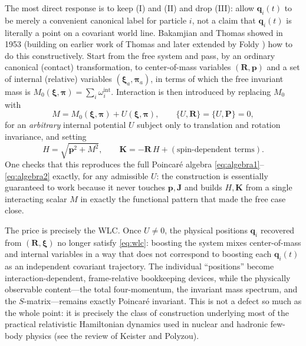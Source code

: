 The most direct response is to keep (I) and (II) and drop (III): allow ${\bm
q}_i(t)$ to be merely a convenient canonical label for particle $i$, not a
claim that ${\bm q}_i(t)$ is literally a point on a covariant world line.
Bakamjian and Thomas showed in 1953  (building on earlier work of Thomas  and
later extended by Foldy ) how to do this constructively. Start from the free
system and pass, by an ordinary canonical (contact) transformation, to
center-of-mass variables $({\bm R},{\bm p})$ and a set of internal (relative)
variables $(\boldsymbol\xi_a,\boldsymbol\pi_a)$, in terms of which the free
invariant mass is
$M_0(\boldsymbol\xi,\boldsymbol\pi)=\sum_i\omega_i^{\text{int}}$. Interaction
is then introduced by replacing $M_0$ with
\begin{equation}
M = M_0(\boldsymbol\xi,\boldsymbol\pi) + U(\boldsymbol\xi,\boldsymbol\pi), 
   \qquad \{U,{\bm R}\}=\{U,{\bm P}\}=0,
\end{equation}
for an \emph{arbitrary} internal potential $U$ subject only to translation and
rotation invariance, and setting
\begin{equation}
H=\sqrt{{\bm p}^2+M^2}, \qquad {\bm K} = -{\bm R}\,H + (\text{spin-dependent terms}).
\end{equation}
One checks that this reproduces the full Poincar\'e algebra
\eqref{eq:algebra1}--\eqref{eq:algebra2} exactly, for any admissible $U$: the
construction is essentially guaranteed to work because it never touches ${\bm
p},{\bm J}$ and builds $H,{\bm K}$ from a single interacting scalar $M$ in
exactly the functional pattern that made the free case close.

The price is precisely the WLC. Once $U\neq0$, the physical positions ${\bm
q}_i$ recovered from $({\bm R},\boldsymbol\xi)$ no longer satisfy
\eqref{eq:wlc}: boosting the system mixes center-of-mass and internal variables
in a way that does not correspond to boosting each ${\bm q}_i(t)$ as an
independent covariant trajectory. The individual ``positions'' become
interaction-dependent, frame-relative bookkeeping devices, while the physically
observable content---the total four-momentum, the invariant mass spectrum, and
the $S$-matrix---remains exactly Poincar\'e invariant. This is not a defect so
much as the whole point: it is precisely the class of construction underlying
most of the practical relativistic Hamiltonian dynamics used in nuclear and
hadronic few-body physics (see the review of Keister and Polyzou).

